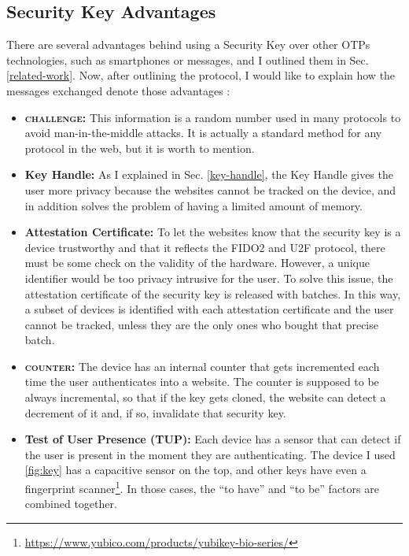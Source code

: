 \subsection{Security Key Advantages}\label{advantages}
There are several advantages behind using a Security Key over other OTPs technologies, such as smartphones or messages, and I outlined them in Sec. \ref{related-work}. Now, after outlining the protocol, I would like to explain how the messages exchanged denote those advantages \cite{lang2016security}:
\begin{itemize}
    \item \textbf{\textsc{challenge}:} This information is a random number used in many protocols to avoid man-in-the-middle attacks. It is actually a standard method for any protocol in the web, but it is worth to mention.
    \item \textbf{Key Handle:} As I explained in Sec. \ref{key-handle}, the Key Handle gives the user more privacy because the websites cannot be tracked on the device, and in addition solves the problem of having a limited amount of memory.
    \item \textbf{Attestation Certificate:} To let the websites know that the security key is a device trustworthy and that it reflects the FIDO2 and U2F protocol, there must be some check on the validity of the hardware. However, a unique identifier would be too privacy intrusive for the user. To solve this issue, the attestation certificate of the security key is released with batches. In this way, a subset of devices is identified with each attestation certificate and the user cannot be tracked, unless they are the only ones who bought that precise batch.
    \item \textbf{\textsc{counter}:} The device has an internal counter that gets incremented each time the user authenticates into a website. The counter is supposed to be always incremental, so that if the key gets cloned, the website can detect a decrement of it and, if so, invalidate that security key.
    \item \textbf{Test of User Presence (TUP):} Each device has a sensor that can detect if the user is present in the moment they are authenticating. The device I used \ref{fig:key} has a capacitive sensor on the top, and other keys have even a fingerprint scanner\footnote{\url{https://www.yubico.com/products/yubikey-bio-series/}}. In those cases, the ``to have'' and ``to be'' factors are combined together.
\end{itemize}